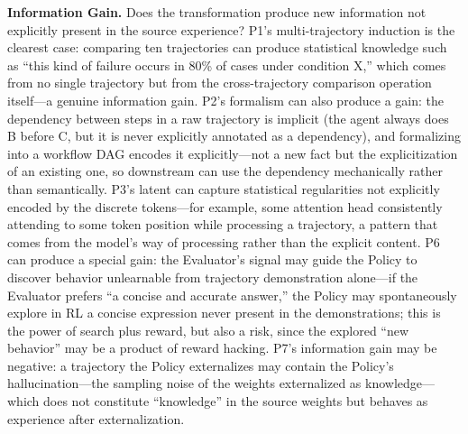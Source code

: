 \textbf{Information Gain.} Does the transformation produce new information not explicitly present in the source experience? P1's multi-trajectory induction is the clearest case: comparing ten trajectories can produce statistical knowledge such as ``this kind of failure occurs in 80\% of cases under condition X,'' which comes from no single trajectory but from the cross-trajectory comparison operation itself---a genuine information gain. P2's formalism can also produce a gain: the dependency between steps in a raw trajectory is implicit (the agent always does B before C, but it is never explicitly annotated as a dependency), and formalizing into a workflow DAG encodes it explicitly---not a new fact but the explicitization of an existing one, so downstream can use the dependency mechanically rather than semantically. P3's latent can capture statistical regularities not explicitly encoded by the discrete tokens---for example, some attention head consistently attending to some token position while processing a trajectory, a pattern that comes from the model's way of processing rather than the explicit content. P6 can produce a special gain: the Evaluator's signal may guide the Policy to discover behavior unlearnable from trajectory demonstration alone---if the Evaluator prefers ``a concise and accurate answer,'' the Policy may spontaneously explore in RL a concise expression never present in the demonstrations; this is the power of search plus reward, but also a risk, since the explored ``new behavior'' may be a product of reward hacking. P7's information gain may be negative: a trajectory the Policy externalizes may contain the Policy's hallucination---the sampling noise of the weights externalized as knowledge---which does not constitute ``knowledge'' in the source weights but behaves as experience after externalization.

